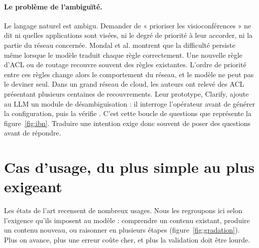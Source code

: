 \paragraph{Le problème de l'ambiguïté.}
Le langage naturel est ambigu. Demander de « prioriser les visioconférences » ne dit ni quelles applications sont visées, ni le degré de priorité à leur accorder, ni la partie du réseau concernée. Mondal et al. montrent que la difficulté persiste même lorsque le modèle traduit chaque règle correctement. Une nouvelle règle d'ACL ou de routage recouvre souvent des règles existantes. L'ordre de priorité entre ces règles change alors le comportement du réseau, et le modèle ne peut pas le deviner seul. Dans un grand réseau de cloud, les auteurs ont relevé des ACL présentant plusieurs centaines de recouvrements. Leur prototype, Clarify, ajoute au LLM un module de désambiguïsation : il interroge l'opérateur avant de générer la configuration, puis la vérifie \cite{mondal2025}. C'est cette boucle de questions que représente la figure~\ref{fig:ibn}. Traduire une intention exige donc souvent de poser des questions avant de répondre.

\section{Cas d'usage, du plus simple au plus exigeant}

Les états de l'art \cite{liu2025,hong2025} recensent de nombreux usages. Nous les regroupons ici selon l'exigence qu'ils imposent au modèle : comprendre un contenu existant, produire un contenu nouveau, ou raisonner en plusieurs étapes (figure~\ref{fig:gradation}). Plus on avance, plus une erreur coûte cher, et plus la validation doit être lourde.

